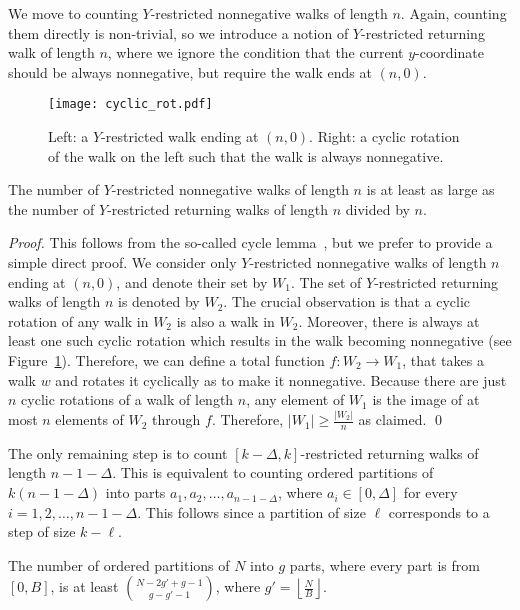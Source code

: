 \documentclass[runningheads]{llncs}
\begin{document}
We move to counting $Y$-restricted nonnegative walks of length
$n$. Again, counting them directly is non-trivial, so we introduce a
notion of $Y$-restricted returning walk of length $n$, where we ignore
the condition that the current $y$-coordinate should be always
nonnegative, but require the walk ends at $(n,0)$.

\begin{figure}
\centering
\texttt{[image: cyclic\_rot.pdf]}
\caption{\label{fig:cyclic-rotation-topk}Left: a $Y$-restricted walk ending
  at $(n,0)$. Right: a cyclic rotation of the walk on the left such
  that the walk is always nonnegative.}
\end{figure}

\begin{lemma}
\label{lem:cycle-lemma-topk}
The number of $Y$-restricted nonnegative walks of length $n$ is at
least as large as the number of $Y$-restricted returning walks of
length $n$ divided by $n$.
\end{lemma}

\begin{proof}
This follows from the so-called cycle lemma~\cite{DM47}, but we prefer
to provide a simple direct proof.  We consider only $Y$-restricted
nonnegative walks of length $n$ ending at $(n,0)$, and denote their
set by $W_1$. The set of $Y$-restricted returning walks of length $n$
is denoted by $W_2$. The crucial observation is that a cyclic rotation
of any walk in $W_2$ is also a walk in $W_2$. Moreover, there is
always at least one such cyclic rotation which results in the walk
becoming nonnegative (see
Figure~\ref{fig:cyclic-rotation-topk}). Therefore, we can define a
total function $f: W_2\rightarrow W_1$, that takes a walk $w$ and
rotates it cyclically as to make it nonnegative. Because there are
just $n$ cyclic rotations of a walk of length $n$, any element of
$W_1$ is the image of at most $n$ elements of $W_2$ through
$f$. Therefore, $|W_1| \geq \frac{|W_2|}{n}$ as claimed.  \qed
\end{proof}

The only remaining step is to count $[k-\Delta,k]$-restricted
returning walks of length $n-1-\Delta$.  This is equivalent to
counting ordered partitions of $k(n-1-\Delta)$ into parts
$a_{1},a_{2},\ldots,a_{n-1-\Delta}$, where $a_{i}\in [0,\Delta]$ for
every $i=1,2,\ldots,n-1-\Delta$.  This follows since a partition of
size $\ell$ corresponds to a step of size $k - \ell$.

\begin{lemma}
The number of ordered partitions of $N$ into $g$ parts, where every
part is from $[0,B]$, is at least $\binom{N-2g'+g-1}{g-g'-1}$, where
$g'=\left\lfloor\frac{N}{B}\right\rfloor$.
\end{lemma}
\end{document}
